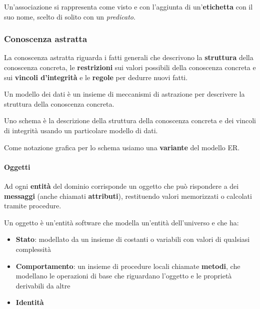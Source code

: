Un'associazione si rappresenta come visto e con l'aggiunta di un'\textbf{etichetta} con il suo nome, scelto di solito con un \textit{predicato}.

\subsubsection{Conoscenza astratta}
La conoscenza astratta riguarda i fatti generali che descrivono la \textbf{struttura} della conoscenza concreta, le \textbf{restrizioni} sui valori possibili della conoscenza concreta e sui \textbf{vincoli d'integrità} e le \textbf{regole} per dedurre nuovi fatti.

\begin{definition}
	Un modello dei dati è un insieme di meccanismi di astrazione per descrivere la struttura della conoscenza concreta.
\end{definition}

\begin{definition}[Schema]
	Uno schema è la descrizione della struttura della conoscenza concreta e dei vincoli di integrità usando un particolare modello di dati.
\end{definition}

\begin{note}
	Come notazione grafica per lo schema usiamo una \textbf{variante} del modello ER.
\end{note}

\paragraph{Oggetti}
Ad ogni \textbf{entità} del dominio corrisponde un oggetto che può rispondere a dei \textbf{messaggi} (anche chiamati \textbf{attributi}), restituendo valori memorizzati o calcolati tramite procedure.

\begin{definition}[Oggetto]
	Un oggetto è un’entità software che	modella un’entità dell’universo e che ha:
	\begin{itemize}
		\item \textbf{Stato}: modellato da un insieme di costanti o variabili con valori di qualsiasi complessità
		\item \textbf{Comportamento}: un insieme di procedure locali chiamate \textbf{metodi}, che modellano le operazioni di base che riguardano l’oggetto e le proprietà	derivabili da altre
		\item \textbf{Identità}
	\end{itemize}
\end{definition}

